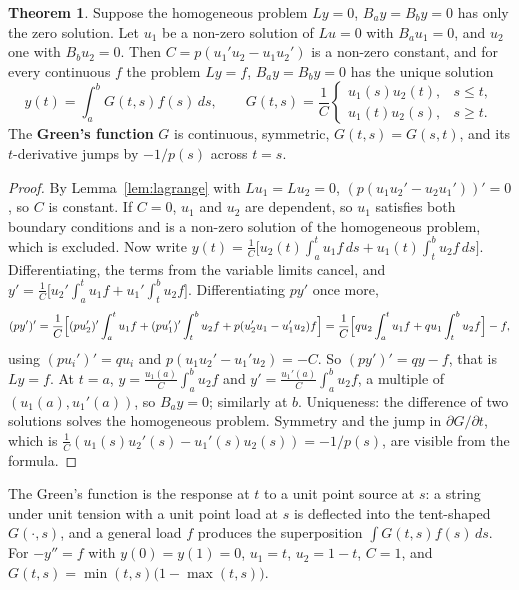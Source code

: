 \documentclass[11pt,a4paper]{article}
\numberwithin{equation}{section}
\theoremstyle{definition}
\newtheorem{thm}{Theorem}[subsection]
\begin{document}
\begin{thm}
\label{thm:greenbvp}
Suppose the homogeneous problem $Ly = 0$, $B_ay = B_by = 0$ has only the zero solution. Let $u_1$ be a non-zero solution of $Lu = 0$ with $B_au_1 = 0$, and $u_2$ one with $B_bu_2 = 0$. Then
$C = p(u_1'u_2 - u_1u_2')$ is a non-zero constant, and for every continuous $f$ the problem $Ly = f$, $B_ay = B_by = 0$ has the unique solution
\[
y(t) = \int_a^bG(t, s)f(s)\,ds, \qquad G(t, s) = \frac1C\begin{cases} u_1(s)u_2(t), & s \leq t,\\ u_1(t)u_2(s), & s \geq t .\end{cases}
\]
The \textbf{Green's function} $G$ is continuous, symmetric, $G(t, s) = G(s, t)$, and its $t$-derivative jumps by $-1/p(s)$ across $t = s$.
\end{thm}

\begin{proof}
By Lemma~\ref{lem:lagrange} with $Lu_1 = Lu_2 = 0$, $(p(u_1u_2' - u_2u_1'))' = 0$, so $C$ is constant. If $C = 0$, $u_1$ and $u_2$ are dependent, so $u_1$ satisfies both boundary conditions and is a non-zero solution of the
homogeneous problem, which is excluded. Now write $y(t) = \frac1C\bigl[u_2(t)\int_a^tu_1f\,ds + u_1(t)\int_t^bu_2f\,ds\bigr]$. Differentiating, the terms from the variable limits cancel, and
$y' = \frac1C\bigl[u_2'\int_a^tu_1f + u_1'\int_t^bu_2f\bigr]$. Differentiating $py'$ once more,
\[
(py')' = \frac1C\Bigl[(pu_2')'\int_a^tu_1f + (pu_1')'\int_t^bu_2f + p(u_2'u_1 - u_1'u_2)f\Bigr] = \frac1C\Bigl[qu_2\int_a^tu_1f + qu_1\int_t^bu_2f\Bigr] - f ,
\]
using $(pu_i')' = qu_i$ and $p(u_1u_2' - u_1'u_2) = -C$. So $(py')' = qy - f$, that is $Ly = f$. At $t = a$, $y = \frac{u_1(a)}{C}\int_a^bu_2f$ and $y' = \frac{u_1'(a)}{C}\int_a^bu_2f$, a multiple of $(u_1(a), u_1'(a))$, so
$B_ay = 0$; similarly at $b$. Uniqueness: the difference of two solutions solves the homogeneous problem. Symmetry and the jump in $\partial G/\partial t$, which is $\frac1C(u_1(s)u_2'(s) - u_1'(s)u_2(s)) = -1/p(s)$, are visible
from the formula.
\end{proof}

The Green's function is the response at $t$ to a unit point source at $s$: a string under unit tension with a unit point load at $s$ is deflected into the tent-shaped $G(\cdot, s)$, and a general
load $f$ produces the superposition $\int G(t, s)f(s)\,ds$. For $-y'' = f$ with $y(0) = y(1) = 0$, $u_1 = t$, $u_2 = 1 - t$, $C = 1$, and $G(t, s) = \min(t, s)\bigl(1 - \max(t, s)\bigr)$.
\end{document}
